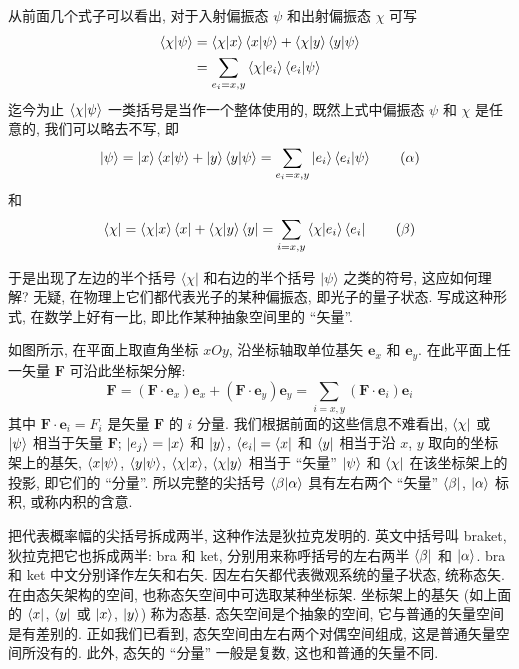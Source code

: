 从前面几个式子可以看出, 对于入射偏振态 $\psi$ 和出射偏振态 $\chi$ 可写
\begin{align*}
\bra{\chi}\ket{\psi} &= \bra{\chi}\ket{x}\bra{x}\ket{\psi} + \bra{\chi}\ket{y}\bra{y}\ket{\psi} \\
&= \sum_{e_i=x, y} \bra{\chi}\ket{e_i}\bra{e_i}\ket{\psi}
\end{align*}
迄今为止 $\bra{\chi}\ket{\psi}$ 一类括号是当作一个整体使用的, 既然上式中偏振态 $\psi$ 和 $\chi$ 是任意的, 我们可以略去不写, 即
\[
\ket{\psi} = \ket{x}\bra{x}\ket{\psi} + \ket{y}\bra{y}\ket{\psi} = \sum_{e_i=x, y} \ket{e_i}\bra{e_i}\ket{\psi} \tag{$\alpha$}
\]
和
\[
\bra{\chi} = \bra{\chi}\ket{x}\bra{x} + \bra{\chi}\ket{y}\bra{y} = \sum_{i=x, y} \bra{\chi}\ket{e_i}\bra{e_i} \tag{$\beta$}
\]

于是出现了左边的半个括号 $\langle\chi|$ 和右边的半个括号 $|\psi\rangle$ 之类的符号, 这应如何理解? 无疑, 在物理上它们都代表光子的某种偏振态, 即光子的量子状态. 写成这种形式, 在数学上好有一比, 即比作某种抽象空间里的 ``矢量''.

如图所示, 在平面上取直角坐标 $xOy$, 沿坐标轴取单位基矢 $\boldsymbol{e}_x$ 和 $\boldsymbol{e}_y$. 在此平面上任一矢量 $\boldsymbol{F}$ 可沿此坐标架分解:
\[
\boldsymbol{F} = (\boldsymbol{F} \cdot \boldsymbol{e}_x)\boldsymbol{e}_x + (\boldsymbol{F} \cdot \boldsymbol{e}_y)\boldsymbol{e}_y = \sum_{i=x, y} (\boldsymbol{F} \cdot \boldsymbol{e}_i)\boldsymbol{e}_i
\]
其中 $\boldsymbol{F} \cdot \boldsymbol{e}_i = F_i$ 是矢量 $\boldsymbol{F}$ 的 $i$ 分量. 我们根据前面的这些信息不难看出, $\bra{\chi}$ 或 $\ket{\psi}$ 相当于矢量 $\boldsymbol{F}$; $\ket{e_j} = \ket{x}$ 和 $\ket{y}$, $\bra{e_i} = \bra{x}$ 和 $\bra{y}$ 相当于沿 $x$, $y$ 取向的坐标架上的基矢, $\bra{x}\ket{\psi}$, $\bra{y}\ket{\psi}$, $\bra{\chi}\ket{x}$, $\bra{\chi}\ket{y}$ 相当于 ``矢量'' $\ket{\psi}$ 和 $\bra{\chi}$ 在该坐标架上的投影, 即它们的 ``分量''. 所以完整的尖括号 $\bra{\beta}\ket{\alpha} $ 具有左右两个 ``矢量'' $\bra{\beta}$, $\ket{\alpha}$ 标积, 或称内积的含意.

把代表概率幅的尖括号拆成两半, 这种作法是狄拉克发明的. 英文中括号叫 braket, 狄拉克把它也拆成两半: bra 和 ket, 分别用来称呼括号的左右两半 $\bra{\beta}$ 和 $\ket{\alpha}$. bra 和 ket 中文分别译作左矢和右矢. 因左右矢都代表微观系统的量子状态, 统称态矢. 在由态矢架构的空间, 也称态矢空间中可选取某种坐标架. 坐标架上的基矢 (如上面的 $\bra{x}$, $\bra{y}$ 或 $\ket{x}$, $\ket{y}$) 称为态基. 态矢空间是个抽象的空间, 它与普通的矢量空间是有差别的. 正如我们已看到, 态矢空间由左右两个对偶空间组成, 这是普通矢量空间所没有的. 此外, 态矢的 ``分量'' 一般是复数, 这也和普通的矢量不同.

